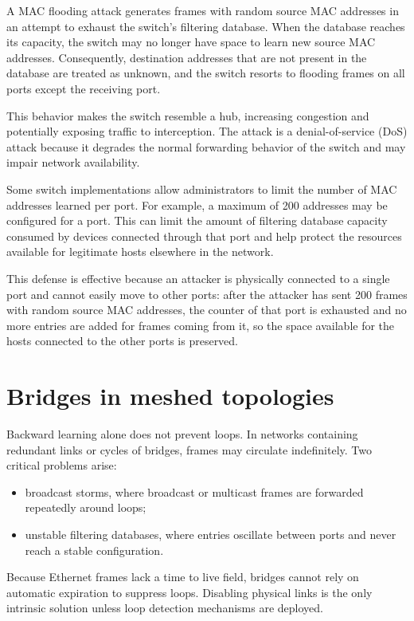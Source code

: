 A MAC flooding attack generates frames with random source MAC addresses in an attempt to exhaust the switch's filtering database. When the database reaches its capacity, the switch may no longer have space to learn new source MAC addresses. Consequently, destination addresses that are not present in the database are treated as unknown, and the switch resorts to flooding frames on all ports except the receiving port.

This behavior makes the switch resemble a hub, increasing congestion and potentially exposing traffic to interception. The attack is a denial-of-service (DoS) attack because it degrades the normal forwarding behavior of the switch and may impair network availability.

Some switch implementations allow administrators to limit the number of MAC addresses learned per port. For example, a maximum of 200 addresses may be configured for a port. This can limit the amount of filtering database capacity consumed by devices connected through that port and help protect the resources available for legitimate hosts elsewhere in the network.

This defense is effective because an attacker is physically connected to a single port and cannot easily move to other ports: after the attacker has sent 200 frames with random source MAC addresses, the counter of that port is exhausted and no more entries are added for frames coming from it, so the space available for the hosts connected to the other ports is preserved.

\section{Bridges in meshed topologies}

Backward learning alone does not prevent loops. In networks containing redundant links or cycles of bridges, frames may circulate indefinitely. Two critical problems arise:

\begin{itemize}
\item broadcast storms, where broadcast or multicast frames are forwarded repeatedly around loops;
\item unstable filtering databases, where entries oscillate between ports and never reach a stable configuration.
\end{itemize}

Because Ethernet frames lack a time to live field, bridges cannot rely on automatic expiration to suppress loops. Disabling physical links is the only intrinsic solution unless loop detection mechanisms are deployed.


